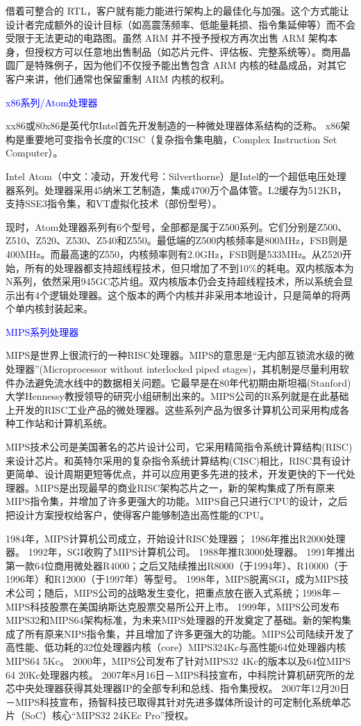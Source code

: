 \documentclass[utf8]{book}
\begin{document}
借着可整合的 RTL，客户就有能力能进行架构上的最佳化与加强。这个方式能让设计者完成额外的设计目标（如高震荡频率、低能量耗损、指令集延伸等）而不会受限于无法更动的电路图。虽然 ARM 并不授予授权方再次出售 ARM 架构本身，但授权方可以任意地出售制品（如芯片元件、评估板、完整系统等）。商用晶圆厂是特殊例子，因为他们不仅授予能出售包含 ARM 内核的硅晶成品，对其它客户来讲，他们通常也保留重制 ARM 内核的权利。

{\Large \textcolor{blue}{x86系列/Atom处理器}}

xx86或80x86是英代尔Intel首先开发制造的一种微处理器体系结构的泛称。
x86架构是重要地可变指令长度的CISC（复杂指令集电脑，Complex Instruction Set Computer）。

Intel Atom（中文：凌动，开发代号：Silverthorne）是Intel的一个超低电压处理器系列。处理器采用45纳米工艺制造，集成4700万个晶体管。L2缓存为512KB，支持SSE3指令集，和VT虚拟化技术（部份型号）。

现时，Atom处理器系列有6个型号，全部都是属于Z500系列。它们分别是Z500、Z510、Z520、Z530、Z540和Z550。最低端的Z500内核频率是800MHz，FSB则是400MHz。而最高速的Z550，内核频率则有2.0GHz，FSB则是533MHz。从Z520开始，所有的处理器都支持超线程技术，但只增加了不到10\%的耗电。双内核版本为N系列，依然采用945GC芯片组。双内核版本仍会支持超线程技术，所以系统会显示出有4个逻辑处理器。这个版本的两个内核并非采用本地设计，只是简单的将两个单内核封装起来。

{\Large \textcolor{blue}{MIPS系列处理器}}

MIPS是世界上很流行的一种RISC处理器。MIPS的意思是“无内部互锁流水级的微处理器”(Microprocessor without interlocked piped stages)，其机制是尽量利用软件办法避免流水线中的数据相关问题。它最早是在80年代初期由斯坦福(Stanford)大学Hennessy教授领导的研究小组研制出来的。MIPS公司的R系列就是在此基础上开发的RISC工业产品的微处理器。这些系列产品为很多计算机公司采用构成各种工作站和计算机系统。

MIPS技术公司是美国著名的芯片设计公司，它采用精简指令系统计算结构(RISC)来设计芯片。和英特尔采用的复杂指令系统计算结构(CISC)相比，RISC具有设计更简单、设计周期更短等优点，并可以应用更多先进的技术，开发更快的下一代处理器。MIPS是出现最早的商业RISC架构芯片之一，新的架构集成了所有原来MIPS指令集，并增加了许多更强大的功能。MIPS自己只进行CPU的设计，之后把设计方案授权给客户，使得客户能够制造出高性能的CPU。

1984年，MIPS计算机公司成立，开始设计RISC处理器；
1986年推出R2000处理器。
1992年，SGI收购了MIPS计算机公司。
1988年推R3000处理器。
1991年推出第一款64位商用微处器R4000；之后又陆续推出R8000（于1994年）、R10000（于1996年）和R12000（于1997年）等型号。
1998年，MIPS脱离SGI，成为MIPS技术公司；随后，MIPS公司的战略发生变化，把重点放在嵌入式系统；1998年－MIPS科技股票在美国纳斯达克股票交易所公开上市。
1999年，MIPS公司发布MIPS32和MIPS64架构标准，为未来MIPS处理器的开发奠定了基础。新的架构集成了所有原来NIPS指令集，并且增加了许多更强大的功能。MIPS公司陆续开发了高性能、低功耗的32位处理器内核（core）MIPS324Kc与高性能64位处理器内核MIPS64 5Kc。
2000年，MIPS公司发布了针对MIPS32 4Kc的版本以及64位MIPS 64 20Kc处理器内核。 
2007年8月16日－MIPS科技宣布，中科院计算机研究所的龙芯中央处理器获得其处理器IP的全部专利和总线、指令集授权。
2007年12月20日－MIPS科技宣布，扬智科技已取得其针对先进多媒体所设计的可定制化系统单芯片（SoC）核心“MIPS32 24KEc Pro”授权。
\end{document}
